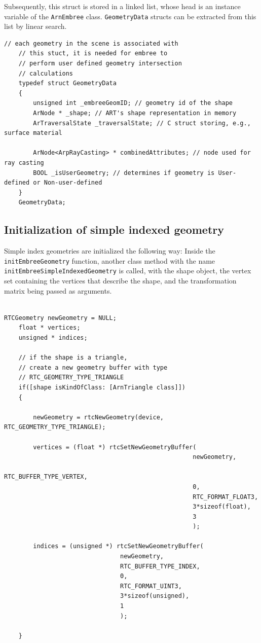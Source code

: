 Subsequently, this struct is stored in a linked list, whose head is an instance variable of the \texttt{ArnEmbree} class. \texttt{GeometryData} structs can be extracted from this list by linear search.
 

\begin{listing} 
	\begin{lstlisting}[caption={\texttt{C} struct associated with each initialized geometry.}, label={lst:geometry_data}]
	// each geometry in the scene is associated with
	// this stuct, it is needed for embree to
	// perform user defined geometry intersection
	// calculations
	typedef struct GeometryData 
	{
		unsigned int _embreeGeomID; // geometry id of the shape
		ArNode * _shape; // ART's shape representation in memory
		ArTraversalState _traversalState; // C struct storing, e.g., surface material
		
		ArNode<ArpRayCasting> * combinedAttributes; // node used for ray casting
		BOOL _isUserGeometry; // determines if geometry is User-defined or Non-user-defined
	}
	GeometryData;
	\end{lstlisting}
\end{listing} 

\subsection{Initialization of simple indexed geometry}
Simple index geometries are initialized the following way: Inside the \texttt{initEmbreeGeometry} function, another class method with the name \texttt{initEmbreeSimpleIndexedGeometry} is called, with the shape object, the vertex set containing the vertices that describe the shape, and the transformation matrix being passed as arguments. 
\\
\\

\begin{listing} 
	\begin{lstlisting}[caption={Setting up geometry buffers for the vertices and indices of a triangle shape.}, label={lst:geometry_buffer}]
	RTCGeometry newGeometry = NULL;
	float * vertices;
	unsigned * indices;
	
	// if the shape is a triangle, 
	// create a new geometry buffer with type
	// RTC_GEOMETRY_TYPE_TRIANGLE
	if([shape isKindOfClass: [ArnTriangle class]]) 
	{
	
		newGeometry = rtcNewGeometry(device, RTC_GEOMETRY_TYPE_TRIANGLE);
		
		vertices = (float *) rtcSetNewGeometryBuffer(
													newGeometry,
													RTC_BUFFER_TYPE_VERTEX,
													0,
													RTC_FORMAT_FLOAT3,
													3*sizeof(float),
													3
													);
		
		indices = (unsigned *) rtcSetNewGeometryBuffer(
		                        newGeometry,
		                        RTC_BUFFER_TYPE_INDEX,
		                        0,
		                        RTC_FORMAT_UINT3,
		                        3*sizeof(unsigned),
		                        1
		                        );
	
	}
	\end{lstlisting}
\end{listing}


